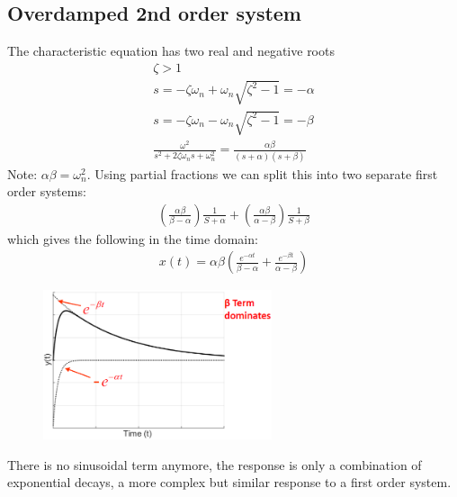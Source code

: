 \documentclass[class=report, crop=false, 12pt,a4paper]{standalone}
\begin{document}
\subsection{Overdamped 2nd order system}
The characteristic equation has two real and negative roots
\begin{gather}
  \zeta > 1\\
  s = - \zeta \omega_n + \omega_n \sqrt{\zeta^2 - 1} = -\alpha\\
  s = - \zeta \omega_n - \omega_n \sqrt{\zeta^2 - 1} = -\beta\\
  \frac{\omega^2}{s^2 + 2\zeta\omega_n s+ \omega_n^2} = \frac{\alpha \beta}{(s+\alpha)(s+\beta)}
\end{gather}
Note: $\alpha \beta = \omega_n^2$. Using partial fractions we can split this into two separate first order systems:
\begin{align}
  \left(\frac{\alpha\beta}{\beta - \alpha}\right) \frac{1}{S + \alpha} + \left(\frac{\alpha\beta}{\alpha - \beta}\right)\frac{1}{S+\beta}
\end{align}
which gives the following in the time domain:
\begin{align}
  x(t) = \alpha \beta \left(\frac{e^{-\alpha t}}{\beta - \alpha} + \frac{e^{-\beta t}}{\alpha - \beta}\right)
\end{align}
\begin{figure}[H]
  \centering
  \includegraphics[width = 0.6\textwidth]{../img/diagram69.png}
\end{figure}
There is no sinusoidal term anymore, the response is only a combination of exponential decays, a more complex but similar response to a first order system. 
\end{document}
